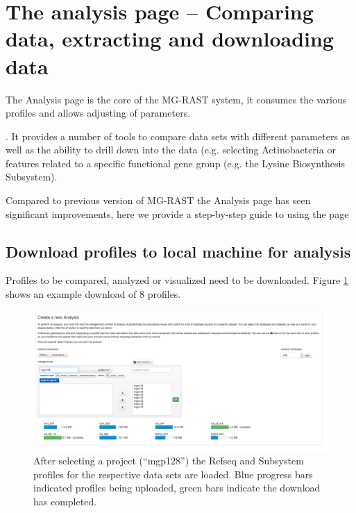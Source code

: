 \documentclass[12pt,fullpage]{report}
\begin{document}

\section{The analysis page -- Comparing data, extracting and downloading data}
\label{section:analysis-page}

The Analysis page is the core of the MG-RAST system, it consumes the various profiles and allows adjusting of parameters.

. It provides a number of tools to compare data sets with different parameters as well as the ability to drill down into the data (e.g. selecting Actinobacteria or features related to a specific functional gene group (e.g. the Lysine Biosynthesis Subsystem).


Compared to previous version of MG-RAST the Analysis page has seen significant improvements, here we provide a step-by-step guide to using the page

\subsection*{Download profiles to local machine for analysis}

Profiles to be compared, analyzed or visualized need to be downloaded. Figure \ref{fig:v4-analysis-profile-load} shows an example download of 8 profiles.


\begin{figure}
\begin{center}
\includegraphics[width=6in]{Images/v4-analysis-page-profile-load.png}
\end{center}
\caption{
After selecting a project (``mgp128'') the Refseq and Subsystem profiles for the respective data sets are loaded. Blue progress bars indicated profiles being uploaded, green bars indicate the download has completed.
}
\label{fig:v4-analysis-profile-load}
\end{figure}
\end{document}
